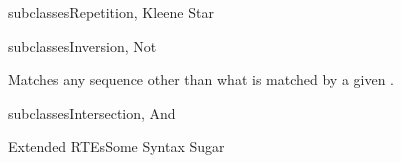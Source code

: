 \newsavebox\starbox
\begin{lrbox}{\starbox}
  \begin{minipage}{12cm}
    
  \end{minipage}
\end{lrbox}

\newsavebox\notbox
\begin{lrbox}{\notbox}
  \begin{minipage}{12cm}
    
  \end{minipage}
\end{lrbox}


\begin{frame}{ subclasses}{Repetition, Kleene Star}
  \usebox\starbox
\end{frame}

\begin{frame}{ subclasses}{Inversion, Not}
  \usebox\notbox

  \bigskip

  Matches any sequence other than what is matched by a given .
\end{frame}

\begin{frame}{ subclasses}{Intersection, And}
  \usebox\andbox
 \end{frame}


\newsavebox\extendedbox
\begin{lrbox}{\extendedbox}
  \begin{minipage}{12cm}
  
  \end{minipage}
\end{lrbox}

\begin{frame}{Extended RTEs}{Some Syntax Sugar}
  \usebox\extendedbox
\end{frame}





